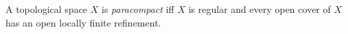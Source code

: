 A topological space $X$ is \emph{paracompact} iff $X$ is regular and every open cover of $X$ has an open locally finite refinement.
